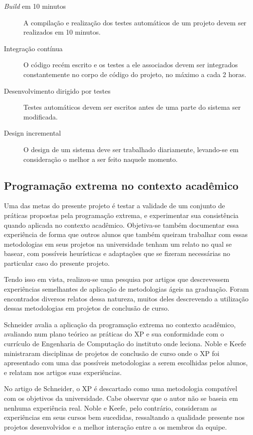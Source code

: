 \documentclass[a4paper,12pt,font=plain,header=plain]{abnt}
\begin{document}
\begin{description}
        \item[\textit{Build} em 10 minutos]
          A compilação e realização dos testes automáticos de um projeto devem ser realizados em 10 minutos.
        \item[Integração contínua]
          O código recém escrito e os testes a ele associados devem ser integrados constantemente no corpo de código do projeto, no máximo a cada 2 horas.
        \item[Desenvolvimento dirigido por testes]
          Testes automáticos devem ser escritos antes de uma parte do sistema ser modificada.
        \item[Design incremental]
          O design de um sistema deve ser trabalhado diariamente, levando-se em consideração o melhor a ser feito naquele momento.
      \end{description}

    \subsection{Programação extrema no contexto acadêmico}
      Uma das metas do presente projeto é testar a validade de um conjunto de práticas propostas pela programação extrema, e experimentar sua consistência quando aplicada no contexto acadêmico. Objetiva-se também documentar essa experiência de forma que outros alunos que também queiram trabalhar com essas metodologias em seus projetos na universidade tenham um relato no qual se basear, com possíveis heurísticas e adaptações que se fizeram necessárias no particular caso do presente projeto.

      Tendo isso em vista, realizou-se uma pesquisa por artigos que descrevessem experiências semelhantes de aplicação de metodologias ágeis na graduação. Foram encontrados diversos relatos dessa natureza, muitos deles descrevendo a utilização dessas metodologias em projetos de conclusão de curso.

      Schneider\cite{schneider03} avalia a aplicação da programação extrema no contexto acadêmico, avaliando num plano teórico as práticas do XP e sua conformidade com o currículo de Engenharia de Computação do instituto onde leciona. Noble\cite{noble04} e Keefe\cite{keefe04} ministraram disciplinas de projetos de conclusão de curso onde o XP foi apresentado com uma das possíveis metodologias a serem escolhidas pelos alunos, e relatam nos artigos suas experiências.

      No artigo de Schneider, o XP é descartado como uma metodologia compatível com os objetivos da universidade. Cabe observar que o autor não se baseia em nenhuma experiência real. Noble e Keefe, pelo contrário, consideram as experiências em seus cursos bem sucedidas, ressaltando a qualidade presente nos projetos desenvolvidos e a melhor interação entre a os membros da equipe.
\end{document}
